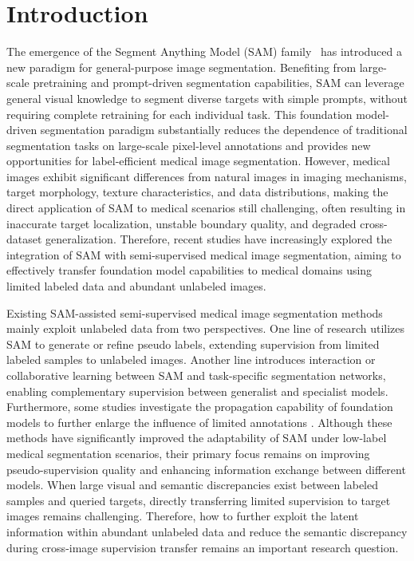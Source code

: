 \documentclass[a4paper,fleqn]{cas-dc}
\begin{document}



\section{Introduction}

The emergence of the Segment Anything Model (SAM) family~\cite{kirillov2023segment, ravi2025sam, carion2026sam} has introduced a new paradigm for general-purpose image segmentation. Benefiting from large-scale pretraining and prompt-driven segmentation capabilities, SAM can leverage general visual knowledge to segment diverse targets with simple prompts, without requiring complete retraining for each individual task. This foundation model-driven segmentation paradigm substantially reduces the dependence of traditional segmentation tasks on large-scale pixel-level annotations and provides new opportunities for label-efficient medical image segmentation. However, medical images exhibit significant differences from natural images in imaging mechanisms, target morphology, texture characteristics, and data distributions, making the direct application of SAM to medical scenarios still challenging, often resulting in inaccurate target localization, unstable boundary quality, and degraded cross-dataset generalization. Therefore, recent studies have increasingly explored the integration of SAM with semi-supervised medical image segmentation, aiming to effectively transfer foundation model capabilities to medical domains using limited labeled data and abundant unlabeled images.


Existing SAM-assisted semi-supervised medical image segmentation methods mainly exploit unlabeled data from two perspectives. One line of research utilizes SAM to generate or refine pseudo labels, extending supervision from limited labeled samples to unlabeled images. Another line introduces interaction or collaborative learning between SAM and task-specific segmentation networks, enabling complementary supervision between generalist and specialist models. Furthermore, some studies investigate the propagation capability of foundation models to further enlarge the influence of limited annotations \cite{semisamplus,scsam,sammatch}. Although these methods have significantly improved the adaptability of SAM under low-label medical segmentation scenarios, their primary focus remains on improving pseudo-supervision quality and enhancing information exchange between different models. When large visual and semantic discrepancies exist between labeled samples and queried targets, directly transferring limited supervision to target images remains challenging. Therefore, how to further exploit the latent information within abundant unlabeled data and reduce the semantic discrepancy during cross-image supervision transfer remains an important research question.
\end{document}
